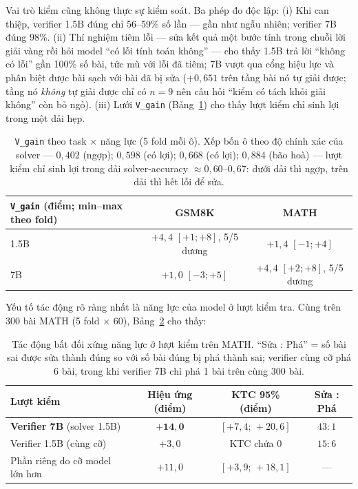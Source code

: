 Vai trò kiểm cũng không thực sự kiểm soát. Ba phép đo độc lập: (i) Khi can thiệp, verifier 1.5B đúng chỉ 56--59\% số lần --- gần như ngẫu nhiên; verifier 7B đúng 98\%. (ii) Thí nghiệm tiêm lỗi --- sửa kết quả một bước tính trong chuỗi lời giải vàng rồi hỏi model ``có lỗi tính toán không'' --- cho thấy 1.5B trả lời ``không có lỗi'' gần 100\% số bài, tức mù với lỗi đã tiêm; 7B vượt qua cổng hiệu lực và phân biệt được bài sạch với bài đã bị sửa ($+0{,}651$ trên tầng bài nó tự giải được; tầng nó \emph{không} tự giải được chỉ có $n=9$ nên câu hỏi ``kiểm có tách khỏi giải không'' còn bỏ ngỏ). (iii) Lưới \texttt{V\_gain} (Bảng~\ref{tab:vgaingrid}) cho thấy lượt kiểm chỉ sinh lợi trong một dải hẹp.

\begin{table}[h]\centering\small
\begin{tabular}{@{}l c c@{}}
\toprule
\texttt{V\_gain} (điểm; min--max theo fold) & GSM8K & MATH\\
\midrule
1.5B & $+4{,}4$ $[+1;+8]$, 5/5 dương & $+1{,}4$ $[-1;+4]$\\
7B   & $+1{,}0$ $[-3;+5]$ & $+4{,}4$ $[+2;+8]$, 5/5 dương\\
\bottomrule
\end{tabular}
\caption{\texttt{V\_gain} theo task $\times$ năng lực (5 fold mỗi ô). Xếp bốn ô theo độ chính xác
của solver --- $0{,}402$ (ngợp); $0{,}598$ (có lợi); $0{,}668$ (có lợi); $0{,}884$ (bão hoà) --- lượt
kiểm chỉ sinh lợi trong dải solver-accuracy $\approx 0{,}60$--$0{,}67$: dưới dải thì ngợp, trên dải
thì hết lỗi để sửa.}
\label{tab:vgaingrid}
\end{table}

Yếu tố tác động rõ ràng nhất là năng lực của model ở lượt kiểm tra. Cùng trên 300 bài MATH (5 fold $\times$ 60), Bảng~\ref{tab:verifier} cho thấy:

\begin{table}[h]\centering\small
\begin{tabular}{@{}l c c c@{}}
\toprule
Lượt kiểm & Hiệu ứng (điểm) & KTC 95\% (điểm) & Sửa : Phá\\
\midrule
\textbf{Verifier 7B} (solver 1.5B) & $\mathbf{+14{,}0}$ & $[+7{,}4;\,+20{,}6]$ & $43:1$\\
Verifier 1.5B (cùng cỡ) & $+3{,}0$ & KTC chứa 0 & $15:6$\\
Phần riêng do cỡ model lớn hơn & $+11{,}0$ & $[+3{,}9;\,+18{,}1]$ & ---\\
\bottomrule
\end{tabular}
\caption{Tác động bất đối xứng năng lực ở lượt kiểm trên MATH. ``Sửa : Phá'' = số bài sai được sửa thành đúng so với số bài đúng bị phá thành sai; verifier cùng cỡ phá 6 bài, trong khi verifier 7B chỉ phá 1 bài trên cùng 300 bài.}
\label{tab:verifier}
\end{table}

